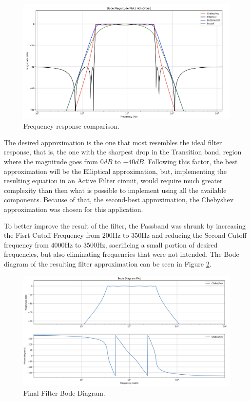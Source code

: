 \begin{figure}[H]
    \centering
    \includegraphics*[scale = 0.3]{Images/FilterBode.png}
    \caption{Frequency response comparison.}
    \label{fig:FilterResponse}
\end{figure}

The desired approximation is the one that most resembles the ideal filter response, that is, the one with the sharpest drop in the Transition band, region where the magnitude goes from $0dB$ to $-40dB$. Following this factor, the best approximation will be the Elliptical approximation, but, implementing the resulting equation in an Active Filter circuit, would require much greater complexity than then what is possible to implement using all the available components. Because of that, the second-best approximation, the Chebyshev approximation was chosen for this application. 

To better improve the result of the filter, the Passband was shrunk by increasing the Fisrt Cutoff Frequency from $200\si{\hertz}$ to $350\si{\hertz}$ and reducing the Second Cutoff frequency from $4000\si{\hertz}$ to $3500\si{\hertz}$, sacrificing a small portion of desired frequencies, but also eliminating frequencies that were not intended. The Bode diagram of the resulting filter approximation can be seen in Figure \ref{fig:FilterFinal}.

\begin{figure}[H]
    \centering
    \includegraphics*[scale = 0.3]{Images/FilterFinal.png}
    \caption{Final Filter Bode Diagram.}
    \label{fig:FilterFinal}
\end{figure}

